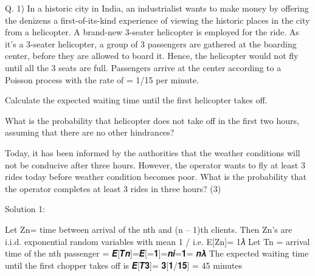 \documentclass[a4paper,12pt]{article}
\begin{document}



Q. 1)
In a historic city in India, an industrialist wants to make money by offering the denizens a first-of-its-kind experience of viewing the historic places in the city from a helicopter. A brand-new 3-seater helicopter is employed for the ride. As it’s a 3-seater helicopter, a group of 3 passengers are gathered at the boarding center, before they are allowed to board it. Hence, the helicopter would not fly until all the 3 seats are full. Passengers arrive at the center according to a Poisson process with the rate of \lambda = 1/15 per minute.
\item  Calculate the expected waiting time until the first helicopter takes off.

\item   What is the probability that helicopter does not take off in the first two hours, assuming that there are no other hindrances?

\item   Today, it has been informed by the authorities that the weather conditions will not be conducive after three hours. However, the operator wants to fly at least 3 rides today before weather condition becomes poor. What is the probability that the operator completes at least 3 rides in three hours?
(3)



Solution 1:
\item 
Let Zn= time between arrival of the nth and (n – 1)th clients.
Then Zn's are i.i.d. exponential random variables with mean 1 / \lambda i.e. E[Zn]= 1𝜆
Let Tn = arrival time of the nth passenger =  𝑬[𝑻𝒏]=𝑬[=𝟏]=𝒏𝒊=𝟏= 𝒏𝝀
The expected waiting time until the first chopper takes off is
𝑬[𝑻𝟑]= 𝟑[𝟏/𝟏𝟓] = 45 minutes
\end{document}
